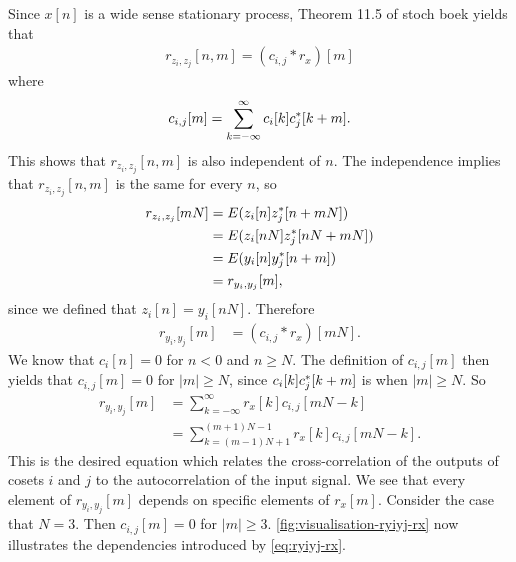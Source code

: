 \documentclass[a4paper, openany, oneside]{memoir}
\begin{document}
Since $x[n]$ is a wide sense stationary process, Theorem 11.5 of stoch boek yields that
\begin{align*}
    r_{z_i,z_j}[n,m] = (c_{i,j} \ast r_{x})[m]
\end{align*}
where
\begin{align*}
    c_{i,j}[m] = \sum_{k=-\infty}^{\infty}c_i[k] c^*_j[k+m].
\end{align*}
This shows that $r_{z_i,z_j}[n,m]$ is also independent of $n$. The independence implies that $r_{z_i,z_j}[n,m]$ is the same for every $n$, so
\begin{align*}
    r_{z_i,z_j}[mN] &= E(z_i[n]z^*_j[n+mN]) \\
    &= E(z_i[nN]z^*_j[nN+mN]) \\
    &= E(y_i[n]y^*_j[n+m]) \\
    &= r_{y_i,y_j}[m],
\end{align*}
since we defined that $z_i[n]=y_i[nN]$. Therefore
\begin{align*}
    r_{y_i,y_j}[m] &= (c_{i,j}\ast r_{x})[mN].
\end{align*}
We know that $c_i[n]=0$ for $n < 0$ and $n \ge N$. The definition of $c_{i,j}[m]$ then yields that $c_{i,j}[m]=0$ for $|m| \ge N$, since $c_i[k]c^*_j[k+m]$ is when $|m| \ge N$. So
\begin{align} \label{eq:ryiyj-rx}
    r_{y_i,y_j}[m] &= \sum_{k=-\infty}^{\infty}r_{x}[k]c_{i,j}[mN-k] \nonumber \\
    &= \sum_{k=(m-1)N+1}^{(m+1)N-1}r_{x}[k]c_{i,j}[mN-k].
\end{align}
This is the desired equation which relates the cross-correlation of the outputs of cosets $i$ and $j$ to the autocorrelation of the input signal. We see that every element of $r_{y_i,y_j}[m]$ depends on specific elements of $r_x[m]$. Consider the case that $N=3$. Then $c_{i,j}[m]=0$ for $|m| \ge 3$. \cref{fig:visualisation-ryiyj-rx} now illustrates the dependencies introduced by \cref{eq:ryiyj-rx}.
\end{document}
